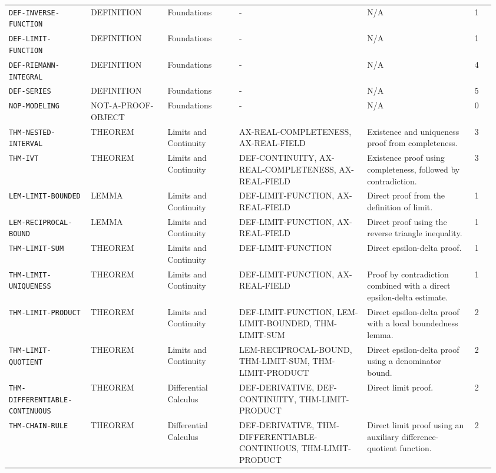 \documentclass[10pt]{article}
\newcommand{\pidraw}[1]{\begingroup\urlstyle{tt}\nolinkurl{#1}\endgroup}
\theoremstyle{definition}
\theoremstyle{remark}
\begin{document}
\begin{landscape}
\begin{longtable}{@{}L{0.16\linewidth}L{0.15\linewidth}L{0.14\linewidth}L{0.25\linewidth}L{0.218\linewidth}C{0.04\linewidth}@{}}
\pidraw{DEF-INVERSE-FUNCTION} & DEFINITION & Foundations & - & N/A & 1 \\
\pidraw{DEF-LIMIT-FUNCTION} & DEFINITION & Foundations & - & N/A & 1 \\
\pidraw{DEF-RIEMANN-INTEGRAL} & DEFINITION & Foundations & - & N/A & 4 \\
\pidraw{DEF-SERIES} & DEFINITION & Foundations & - & N/A & 5 \\
\pidraw{NOP-MODELING} & NOT-A-PROOF-OBJECT & Foundations & - & N/A & 0 \\
\pidraw{THM-NESTED-INTERVAL} & THEOREM & Limits and Continuity & AX-REAL-COMPLETENESS, AX-REAL-FIELD & Existence and uniqueness proof from completeness. & 3 \\
\pidraw{THM-IVT} & THEOREM & Limits and Continuity & DEF-CONTINUITY, AX-REAL-COMPLETENESS, AX-REAL-FIELD & Existence proof using completeness, followed by contradiction. & 3 \\
\pidraw{LEM-LIMIT-BOUNDED} & LEMMA & Limits and Continuity & DEF-LIMIT-FUNCTION, AX-REAL-FIELD & Direct proof from the definition of limit. & 1 \\
\pidraw{LEM-RECIPROCAL-BOUND} & LEMMA & Limits and Continuity & DEF-LIMIT-FUNCTION, AX-REAL-FIELD & Direct proof using the reverse triangle inequality. & 1 \\
\pidraw{THM-LIMIT-SUM} & THEOREM & Limits and Continuity & DEF-LIMIT-FUNCTION & Direct epsilon-delta proof. & 1 \\
\pidraw{THM-LIMIT-UNIQUENESS} & THEOREM & Limits and Continuity & DEF-LIMIT-FUNCTION, AX-REAL-FIELD & Proof by contradiction combined with a direct epsilon-delta estimate. & 1 \\
\pidraw{THM-LIMIT-PRODUCT} & THEOREM & Limits and Continuity & DEF-LIMIT-FUNCTION, LEM-LIMIT-BOUNDED, THM-LIMIT-SUM & Direct epsilon-delta proof with a local boundedness lemma. & 2 \\
\pidraw{THM-LIMIT-QUOTIENT} & THEOREM & Limits and Continuity & LEM-RECIPROCAL-BOUND, THM-LIMIT-SUM, THM-LIMIT-PRODUCT & Direct epsilon-delta proof using a denominator bound. & 2 \\
\pidraw{THM-DIFFERENTIABLE-CONTINUOUS} & THEOREM & Differential Calculus & DEF-DERIVATIVE, DEF-CONTINUITY, THM-LIMIT-PRODUCT & Direct limit proof. & 2 \\
\pidraw{THM-CHAIN-RULE} & THEOREM & Differential Calculus & DEF-DERIVATIVE, THM-DIFFERENTIABLE-CONTINUOUS, THM-LIMIT-PRODUCT & Direct limit proof using an auxiliary difference-quotient function. & 2 \\

\end{longtable}
\end{landscape}
\end{document}
